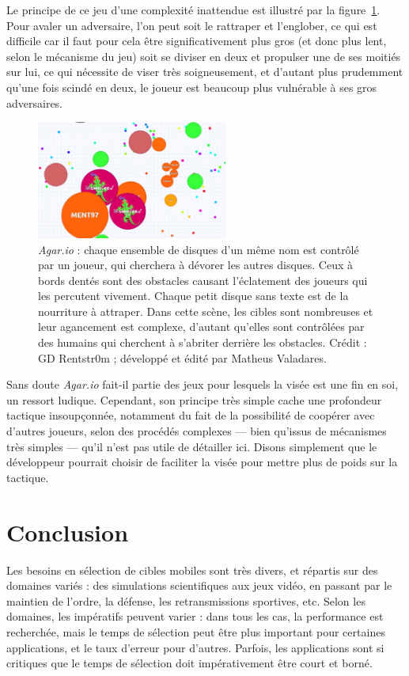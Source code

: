 	Le principe de ce jeu d'une complexité inattendue est illustré par la figure~\ref{fig:agario}. Pour avaler un adversaire, l'on peut soit le rattraper et l'englober, ce qui est difficile car il faut pour cela être significativement plus gros (et donc plus lent, selon le mécanisme du jeu) soit se diviser en deux et propulser une de ses moitiés sur lui, ce qui nécessite de viser très soigneusement, et d'autant plus prudemment qu'une fois scindé en deux, le joueur est beaucoup plus vulnérable à ses gros adversaires.
	
	\begin{figure}[!htbp]
		\centering
		\includegraphics[width=0.56\textwidth]{figures/ch1/agario}
		\caption[\emph{Agar.io}]{\emph{Agar.io} : chaque ensemble de disques d'un même nom est contrôlé par un joueur, qui cherchera à dévorer les autres disques. Ceux à bords dentés sont des obstacles causant l'éclatement des joueurs qui les percutent vivement. Chaque petit disque sans texte est de la nourriture à attraper. Dans cette scène, les cibles sont nombreuses et leur agancement est complexe, d'autant qu'elles sont contrôlées par des humains qui cherchent à s'abriter derrière les obstacles. Crédit : GD Rentstr0m\footnotemark{} ; développé et édité par Matheus Valadares.}
		\label{fig:agario}
	\end{figure}
	
	
	Sans doute \emph{Agar.io} fait-il partie des jeux pour lesquels la visée est une fin en soi, un ressort ludique. Cependant, son principe très simple cache une profondeur tactique insoupçonnée, notamment du fait de la possibilité de coopérer avec d'autres joueurs, selon des procédés complexes --- bien qu'issus de mécanismes très simples --- qu'il n'est pas utile de détailler ici. Disons simplement que le développeur pourrait choisir de faciliter la visée pour mettre plus de poids sur la tactique.

	
	\section{Conclusion}    
	Les besoins en sélection de cibles mobiles sont très divers, et répartis sur des domaines variés : des simulations scientifiques aux jeux vidéo, en passant par le maintien de l'ordre, la défense, les retransmissions sportives, etc. Selon les domaines, les impératifs peuvent varier : dans tous les cas, la performance est recherchée, mais le temps de sélection peut être plus important pour certaines applications, et le taux d'erreur pour d'autres. Parfois, les applications sont si critiques que le temps de sélection doit impérativement être court et borné.
	
